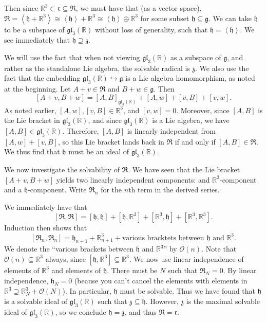 \documentclass[11pt, letterpaper]{article}
\theoremstyle{plain}
\begin{document}
Then since $\mathbb{R} ^3 \subset \mathfrak{r} \subseteq \mathfrak{R} $, we must have that (as a vector space), $\mathfrak{R} =\left\langle \mathfrak{h} +\mathbb{R} ^3 \right\rangle\cong \left\langle \mathfrak{h}  \right\rangle +\mathbb{R} ^3 \cong \left\langle \mathfrak{h}  \right\rangle \oplus \mathbb{R} ^3$ for some subset $\mathfrak{h} \subseteq \mathfrak{g} $. We can take $\mathfrak{h} $ to be a subspace of $\mathfrak{gl} _3(\mathbb{R} )$ without loss of generality, such that $\mathfrak{h} =\left\langle \mathfrak{h}  \right\rangle $. We see immediately that $\mathfrak{h}   \supseteq \mathfrak{z} $.

We will use the fact that when not viewing $\mathfrak{gl} _3(\mathbb{R} )$ as a subspace of $\mathfrak{g} $, and rather as the standalone Lie algebra, the solvable radical is $\mathfrak{z} $. We also use the fact that the embedding $\mathfrak{gl} _3(\mathbb{R} )\hookrightarrow \mathfrak{g} $ is a Lie algebra homomorphism, as noted at the beginning. Let $A+v\in \mathfrak{R} $ and $B+w\in \mathfrak{g} $. Then
\[
	[A+v,B+w] = [A,B]_{\mathfrak{gl} _3(\mathbb{R} )} +[A,w] + [v,B] + [v,w]
.\]
As noted earlier, $[A,w],[v,B]\in\mathbb{R} ^3$, and $[v,w]=0$. Moreover, since $[A,B]$ is the Lie bracket in $\mathfrak{gl} _3(\mathbb{R} )$, and since $\mathfrak{gl} _3(\mathbb{R} )$ is a Lie algebra, we have $[A,B]\in \mathfrak{gl} _3(\mathbb{R} )$. Therefore, $[A,B]$ is linearly independent from $[A,w] + [v,B]$, so this Lie bracket lands back in $\mathfrak{R} $ if and only if $[A,B] \in \mathfrak{R} $. We thus find that $\mathfrak{h} $ must be an ideal of $\mathfrak{gl} _3(\mathbb{R} )$.

We now investigate the solvability of $\mathfrak{R} $. We have seen that the Lie bracket $[A+v,B+w]$ yields two linearly independent components: and $\mathbb{R} ^3$-component and a $\mathfrak{h} $-component. Write $\mathfrak{R} _n$ for the $n$th term in the derived series.

We immediately have that
\[
	[\mathfrak{R} ,\mathfrak{R} ] = [\mathfrak{h} ,\mathfrak{h} ] + [\mathfrak{h} ,\mathbb{R} ^3] + [\mathbb{R} ^3, \mathfrak{h} ] + [\mathbb{R} ^3,\mathbb{R} ^3]
.\]
Induction then shows that
\[
	[\mathfrak{R} _n,\mathfrak{R} _n] = \mathfrak{h}_{n+1} +\mathbb{R} ^3_{n+1} +\text{various bracktets between $\mathfrak{h} $ and $\mathbb{R} ^3$} 
.\]
We denote the ``various brackets between $\mathfrak{h} $ and $\mathbb{R} ^3$'' by $\mathcal{O}(n)$. Note that $\mathcal{O} (n)\subseteq \mathbb{R} ^3$ always, since $[\mathfrak{h} ,\mathbb{R} ^3]\subseteq \mathbb{R} ^3$. 
We now use linear independence of elements of $\mathbb{R} ^3$ and elements of $\mathfrak{h} $. There must be $N$ such that $\mathfrak{R} _N=0$. By linear independence, $\mathfrak{h} _N=0$ (beause you can't cancel the elements with elements in $\mathbb{R} ^3 \supseteq \mathbb{R} ^3_N + \mathcal{O} (N)$). In particular, $\mathfrak{h} $ must be solvable. Thus we have found that $\mathfrak{h} $ is a solvable ideal of $\mathfrak{gl} _3(\mathbb{R} )$ such that $\mathfrak{z} \subseteq \mathfrak{h} $. However, $\mathfrak{z} $ is the maximal solvable ideal of $\mathfrak{gl} _3(\mathbb{R} )$, so we conclude $\mathfrak{h} =\mathfrak{z} $, and thus $\mathfrak{R} =\mathfrak{r} $.
\end{document}
